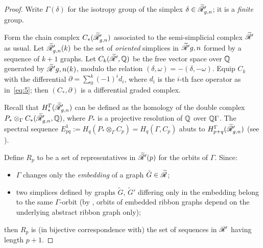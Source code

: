 \begin{proof}
  Write $\Gamma(\delta)$ for the isotropy group of the simplex $\delta \in \mathscr{\widetilde R}'_{g,n}$;
  it is a \emph{finite} group.

  Form the chain complex $C_*(\mathscr{\widetilde R}'_{g,n})$ associated to the
  semi-simplicial complex $\mathscr{\widetilde R}'$ as usual.  Let $\mathscr{\widetilde R}'_{g,n}(k)$ be
  the set of \emph{oriented} simplices in $\mathscr{\widetilde R}'{g,n}$ formed by a
  sequence of $k+1$ graphs.  Let $C_k(\mathscr{\widetilde R}', \mathbb{Q})$ be the free vector
  space over $\mathbb{Q}$ generated by $\mathscr{\widetilde R}'{g,n}(k)$, modulo the relation
  $(\delta, \omega) = -(\delta, -\omega)$.  Equip $C_k$ with the differential $\partial = \sum_0^k
  (-1)^id_i$, where $d_i$ is the $i$-th face operator as
  in~\eqref{eq:5}; then $(C_*, \partial)$ is a differential graded complex.

  Recall that $H^\Gamma_*(\mathscr{\widetilde R}'_{g,n})$ can be defined as the homology of
  the double complex $P_* \otimes_\Gamma C_*(\mathscr{\widetilde R}'_{g,n}, \mathbb{Q})$, where $P_*$ is a
  projective resolution of $\mathbb{Q}$ over $\mathbb{Q}\Gamma$.  The spectral sequence
  $E^1_{pq} := H_q(P_* \otimes_\Gamma C_p) = H_q(\Gamma, C_p)$ abuts to
  $H^\Gamma_{p+q}(\mathscr{\widetilde R}'_{g,n})$ (see \cite[VII.5 and VII.7]{brown}).

  Define $R_p$ to be a set of representatives in $\mathscr{\widetilde R}'(p)$ for the
  orbits of $\Gamma$.  Since:
  \begin{itemize}
  \item $\Gamma$ changes only the \emph{embedding} of a graph ${\tilde G} \in
    \mathscr{\widetilde R}$;
  \item two simplices defined by graphs ${\tilde G}$, $\tilde G'$
    differing only in the embedding belong to the same $\Gamma$-orbit (by
    , orbits of embedded ribbon
    graphs depend on the underlying abstract ribbon graph only);
  \end{itemize}
  then $R_p$ is (in bijective correspondence with) the set of
  sequences in $\mathscr{R}'$ having length $p+1$.


\end{proof}
